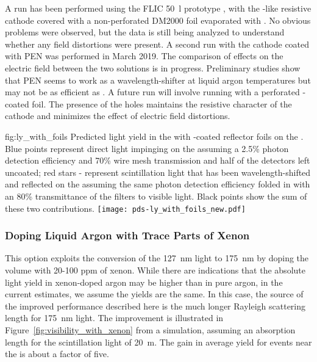 A run has been performed using the  FLIC \SI{50}{l} prototype , with
the -like resistive cathode covered with a non-perforated DM2000
foil evaporated with . No obvious  problems were observed, but 
the data is still being analyzed to understand whether any field
distortions were present.  A second run with the cathode coated with PEN
was performed in March 2019. The comparison of effects on the electric field between the two solutions is in progress. Preliminary studies show that PEN seems to work as a wavelength-shifter at liquid argon temperatures but may not be as efficient as . A future run will involve running with a perforated -coated foil. The presence of the holes maintains the resistive character of the cathode and minimizes the effect of electric field distortions. 



\begin{dunefigure}{fig:ly_with_foils}
{Predicted light yield in the  with -coated reflector foils on the . Blue points represent direct  light impinging on the  assuming a 2.5\% photon detection efficiency and 70\% wire mesh transmission and half of the detectors left uncoated; red stars - represent scintillation light that has been wavelength-shifted and reflected on the  assuming the same photon detection efficiency folded in with an 80\% transmittance of the filters to visible light. Black points show the sum of these two contributions.}
\texttt{[image: pds-ly\_with\_foils\_new.pdf]}
\end{dunefigure}

\subsubsection{Doping Liquid Argon with Trace Parts of Xenon}
\label{sec:fdsp-pd-enh-xenon}


This option exploits the conversion of the  \SI{127}{nm} light to \SI{175}{nm} by doping the \lar volume with 20-100 ppm of xenon.  While there are indications that the absolute light yield in xenon-doped argon may be higher than in pure argon, in the current estimates, we assume the yields are the same. In this case, the source of the improved performance described here is the much longer Rayleigh scattering length for \SI{175}{nm} light.  The improvement is illustrated in Figure~\ref{fig:visibility_with_xenon} from a   simulation, assuming an absorption length for the scintillation light of \SI{20}{m}. The gain in average yield for events near the  is about a factor of five.

